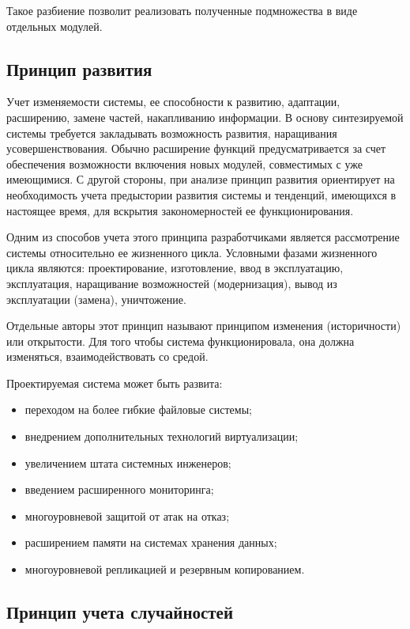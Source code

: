 Такое разбиение позволит реализовать полученные подмножества в виде отдельных модулей.

\subsection{Принцип развития}

Учет изменяемости системы, ее способности к развитию, адаптации, расширению, замене частей, накапливанию информации.
В основу синтезируемой системы требуется закладывать возможность развития, наращивания усовершенствования.
Обычно расширение функций предусматривается за счет обеспечения возможности включения новых модулей, совместимых с уже имеющимися.
С другой стороны, при анализе принцип развития ориентирует на необходимость учета предыстории развития системы и тенденций, имеющихся в настоящее время, для вскрытия закономерностей ее функционирования.

Одним из способов учета этого принципа разработчиками является рассмотрение системы относительно ее жизненного цикла.
Условными фазами жизненного цикла являются: проектирование, изготовление, ввод в эксплуатацию, эксплуатация, наращивание возможностей (модернизация), вывод из эксплуатации (замена), уничтожение.

Отдельные авторы этот принцип называют принципом изменения (историчности) или открытости.
Для того чтобы система функционировала, она должна изменяться, взаимодействовать со средой.

Проектируемая система может быть развита:
\begin{itemize}
  \item переходом на более гибкие файловые системы;
  \item внедрением дополнительных технологий виртуализации;
  \item увеличением штата системных инженеров;
  \item введением расширенного мониторинга;
  \item многоуровневой защитой от атак на отказ;
  \item расширением памяти на системах хранения данных;
  \item многоуровневой репликацией и резервным копированием.
\end{itemize}

\subsection{Принцип учета случайностей}

